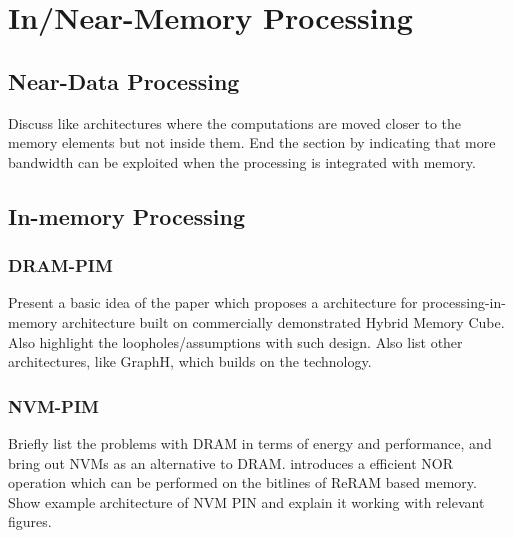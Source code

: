 \section{In/Near-Memory Processing}

  \subsection{Near-Data Processing}
  Discuss \cite{Biscuit} like architectures where the computations are moved closer to the memory elements but not inside them.
  End the section by indicating that more bandwidth can be exploited when the processing is integrated with memory.
  
  \subsection{In-memory Processing}
      
    \subsubsection{DRAM-PIM}
      Present a basic idea of the \cite{AMC} paper which proposes a architecture for processing-in-memory architecture built on commercially demonstrated Hybrid Memory Cube. Also highlight the loopholes/assumptions with such design. Also list other architectures, like GraphH\cite{GraphH}, which builds on the technology.

    \subsubsection{NVM-PIM}
      Briefly list the problems with DRAM in terms of energy and performance, and bring out NVMs as an alternative to DRAM.
      \cite{MagicNOR} introduces a efficient NOR operation which can be performed on the bitlines of ReRAM based memory. Show example architecture of NVM PIN and explain it working with relevant figures.
